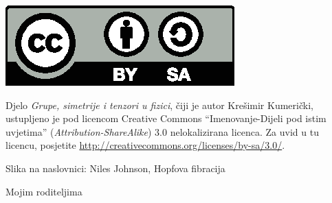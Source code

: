 
\thispagestyle{empty}

\vspace*{22em}

\centerline{\includegraphics[scale=1.0,clip]{pics/by-sa.eps}}
Djelo \emph{Grupe, simetrije i tenzori u fizici}, čiji je autor Krešimir
Kumerički, ustupljeno je pod licencom Creative Commons 
``Imenovanje-Dijeli pod istim uvjetima'' (\emph{Attribution-ShareAlike}) 
3.0 nelokalizirana licenca.
Za uvid u tu licencu, posjetite
\url{http://creativecommons.org/licenses/by-sa/3.0/}.

\vspace*{5em}
Slika na naslovnici: Niles Johnson, Hopfova fibracija

\cleardoublepage
\thispagestyle{empty}
\vspace*{20em}
\begin{flushright}
Mojim roditeljima
\end{flushright}
\cleardoublepage
